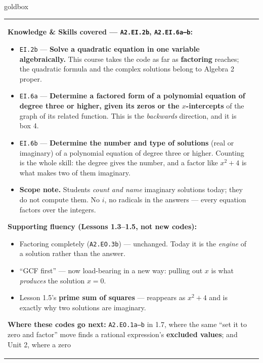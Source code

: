 \documentclass[10pt]{article}
\begin{document}
\renewcommand{\arraystretch}{1.6}
\begin{skillbox}{goldbox}
\begin{tabularx}{\linewidth}{@{}X|X@{}}
\begin{minipage}[t]{\linewidth}\vspace{0pt}
\textbf{Knowledge \& Skills covered --- \texttt{A2.EI.2b}, \texttt{A2.EI.6a--b}:}
\begin{itemize}[leftmargin=1.1em, itemsep=2pt, topsep=2pt]
  \item \texttt{EI.2b} --- \textbf{Solve a quadratic equation in one variable algebraically.} This
        course takes the code as far as \textbf{factoring} reaches; the quadratic formula and the
        complex solutions belong to Algebra 2 proper.
  \item \texttt{EI.6a} --- \textbf{Determine a factored form of a polynomial equation of degree
        three or higher, given its zeros or the $x$-intercepts} of the graph of its related
        function. This is the \emph{backwards} direction, and it is box 4.
  \item \texttt{EI.6b} --- \textbf{Determine the number and type of solutions} (real or imaginary)
        of a polynomial equation of degree three or higher. Counting is the whole skill: the degree
        gives the number, and a factor like $x^2+4$ is what makes two of them imaginary.
  \item \textbf{Scope note.} Students \emph{count and name} imaginary solutions today; they do not
        compute them. No $i$, no radicals in the answers --- every equation factors over the
        integers.
\end{itemize}
\textbf{Supporting fluency (Lessons 1.3--1.5, not new codes):}
\begin{itemize}[leftmargin=1.1em, itemsep=2pt, topsep=2pt]
  \item Factoring completely (\texttt{A2.EO.3b}) --- unchanged. Today it is the \emph{engine} of a
        solution rather than the answer.
  \item ``GCF first'' --- now load-bearing in a new way: pulling out $x$ is what \emph{produces}
        the solution $x=0$.
  \item Lesson 1.5's \textbf{prime sum of squares} --- reappears as $x^2+4$ and is exactly why two
        solutions are imaginary.
\end{itemize}
\textbf{Where these codes go next:} \texttt{A2.EO.1a--b} in 1.7, where the same ``set it to zero
and factor'' move finds a rational expression's \textbf{excluded values}; and Unit 2, where a zero

\end{minipage}
\end{tabularx}
\end{skillbox}
\end{document}
